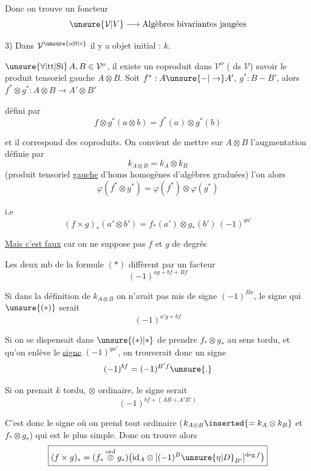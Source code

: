 Donc on trouve un foncteur 
\[
\unsure{\mathcal V|V} \longrightarrow \text{Algèbres bivariantes jaugées}
\]

3) Dans $\mathcal V^{\unsure{o|0|\circ}}$  il y a objet initial : $k$.

$\unsure{\forall|\mathrm{tt}|\text{Si}}\, A,B\in\mathcal V^{o}$, il existe un coproduit dans $\mathcal V^{o}$ ( ds $\mathcal V$) savoir le produit tensoriel gauche $A\otimes B$. Soit  $f^*:A\unsure{-|\to}A'$, $g^*:B-B'$, alors $f^*\otimes g^*:A\otimes B\to A'\otimes B'$

défini par
\[
f\otimes g^*(a\otimes b)=f^*(a)\otimes g^*(b)
\]

et il  correspond des coproduits.  On convient de mettre sur $A\otimes B$ l'augmentation définie par
\[
k_{A\otimes B}=k_A\otimes k_B
\]
(produit tensoriel \uline{gauche} d'homs homogènes d'algèbres graduées)
 l'on  alors 
\[
\varphi(f^*\otimes g^*)=\varphi(f^*)\otimes\varphi(g^*)
\]

i.e
\[
(f\times g)_*(a'\otimes b')=f_*(a')\otimes g_*(b')\,(-1)^{ga'} \tag*{$(\ast)$}
\]

\uline{Mais c'est faux}  car on ne suppose pas $f$ et $g$ de degrés 

Les deux mb de la formule $(\ast)$ diffèrent par un facteur
\[
(-1)^{ag+bf+Bf}
\]

Si dans la définition de $k_{A\otimes B}$ on n'avait pas mis de signe $(-1)^{Bx}$, le signe qui   $\unsure{(\ast)}$ serait
\[
(-1)^{a'g+bf}
\]

Si  on se dispensait dans $\unsure{(\ast)|\ast}$ de prendre $f_*\otimes g_*$ au sens  tordu, et qu'on  enlève le \uline{signe} $(-1)^{ga'}$, on trouverait donc un signe
\[
(-1)^{bf}=(-1)^{B'f}\unsure{.}
\]

Si on prenait $k$ tordu, $\otimes$ ordinaire, le signe serait
\[
(-1)^{bf+(AB+A'B')}
\]

C'est donc le signe où on prend tout ordinaire ($k_{A\otimes B}\inserted{=k_A\otimes k_B}$ et $f_*\otimes g_*$) qui est le plus simple. Donc on trouve alors
\[
\boxed{(f\times g)_*=(f_*\overset{\mathrm{ord}}{\otimes}g_*)\bigl(\mathrm{id}_A\otimes[(-1)^B\unsure{\eta|D}_{B'}]^{\deg f}\bigr)}
\]


